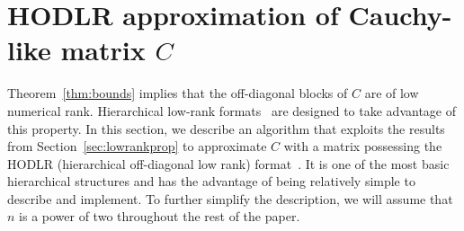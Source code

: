 \documentclass[final,reqno,onefignum,onetabnum]{siamart190516}
\begin{document}
\section{HODLR approximation of Cauchy-like matrix $C$}
\label{sec:HODLR}


Theorem~\ref{thm:bounds} implies that the off-diagonal blocks of $C$ are of low numerical rank. 
Hierarchical low-rank formats~\cite{hackbusch2015hierarchical} are designed to take advantage of this property. In this section, we describe an algorithm that exploits the results from Section~\ref{sec:lowrankprop} 
to approximate $C$ with a matrix possessing the HODLR (hierarchical off-diagonal low rank) format~\cite{martinsson2011fast}. It is one of the most basic hierarchical structures and has the advantage of being relatively simple to describe and implement. 
To further simplify the description, we will assume that $n$ is a power of two throughout the rest of the paper.
\end{document}

